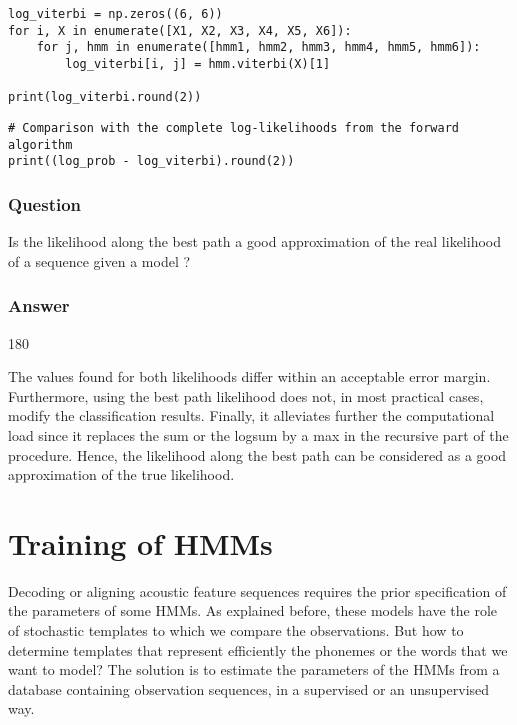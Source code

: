 \documentclass[11pt]{article}
\newenvironment{answer}{\begin{turn}{180}\begin{minipage}[t]{\linewidth}\begin{itshape}}{\end{itshape}\end{minipage}\end{turn}}
\begin{document}
\begin{verbatim}
log_viterbi = np.zeros((6, 6))
for i, X in enumerate([X1, X2, X3, X4, X5, X6]):
    for j, hmm in enumerate([hmm1, hmm2, hmm3, hmm4, hmm5, hmm6]):
        log_viterbi[i, j] = hmm.viterbi(X)[1]

print(log_viterbi.round(2))
\end{verbatim}

\begin{verbatim}
# Comparison with the complete log-likelihoods from the forward algorithm
print((log_prob - log_viterbi).round(2))
\end{verbatim}

\subsubsection{Question}
\label{sec:org9fcdd58}
Is the likelihood along the best path a good approximation of the real
likelihood of a sequence given a model ?

\subsubsection{Answer}
\label{sec:org9827d9f}
\begin{answer}
The values found for both likelihoods differ within an acceptable error
margin. Furthermore, using the best path likelihood does not, in most
practical cases, modify the classification results. Finally, it
alleviates further the computational load since it replaces the sum or
the logsum by a max in the recursive part of the procedure. Hence, the
likelihood along the best path can be considered as a good approximation
of the true likelihood.
\end{answer}

\section{Training of HMMs}
\label{sec:org40518f6}
Decoding or aligning acoustic feature sequences requires the prior
specification of the parameters of some HMMs. As explained before,
these models have the role of stochastic templates to which we compare
the observations. But how to determine templates that represent
efficiently the phonemes or the words that we want to model? The
solution is to estimate the parameters of the HMMs from a database
containing observation sequences, in a supervised or an unsupervised
way.
\end{document}
